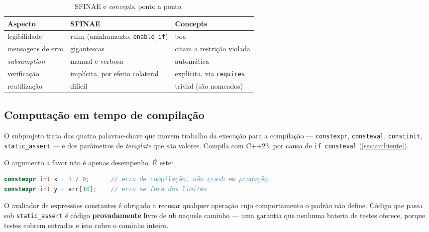 \begin{table}[htbp]
\centering
\caption{SFINAE e \emph{concepts}, ponto a ponto.}
\label{tab:sfinae-concepts}
\footnotesize
\begin{tabular}{@{}lll@{}}
\toprule
\textbf{Aspecto} & \textbf{SFINAE} & \textbf{Concepts} \\
\midrule
legibilidade         & ruim (aninhamento, \texttt{enable\_if}) & boa \\
mensagens de erro    & gigantescas                             & citam a restrição violada \\
\emph{subsumption}   & manual e verbosa                        & automática \\
verificação          & implícita, por efeito colateral         & explícita, via \texttt{requires} \\
reutilização         & difícil                                 & trivial (são nomeados) \\
\bottomrule
\end{tabular}
\end{table}

\subsection{Computação em tempo de compilação}
\label{sec:compile-time}

O subprojeto  trata das quatro palavras-chave que movem
trabalho da execução para a compilação --- \texttt{constexpr},
\texttt{consteval}, \texttt{constinit}, \texttt{static\_assert} --- e dos
parâmetros de \emph{template} que são valores. Compila com C++23, por causa de
\texttt{if consteval} (\cref{sec:ambiente}).

O argumento a favor não é apenas desempenho. É este:

\begin{porque}
\begin{lstlisting}[style=bt, language=C++, frame=none,
                   xleftmargin=0pt, xrightmargin=0pt]
constexpr int x = 1 / 0;      // erro de compilação, não crash em produção
constexpr int y = arr[10];    // erro se fora dos limites
\end{lstlisting}
O avaliador de expressões constantes é obrigado a recusar qualquer operação cujo
comportamento o padrão não define. Código que passa sob \texttt{static\_assert}
é código \textbf{provadamente} livre de \gls{ub} naquele caminho --- uma
garantia que nenhuma bateria de testes oferece, porque testes cobrem entradas e
isto cobre o caminho inteiro.
\end{porque}


